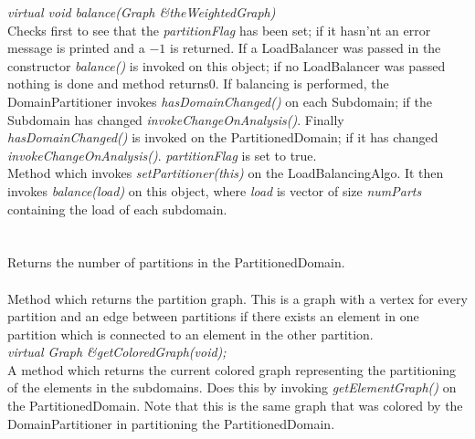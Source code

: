 {\em virtual void balance(Graph \&theWeightedGraph)} \\
Checks first to see that the {\em partitionFlag} has been set; if it
hasn'nt an error message is printed and a $-1$ is returned. If a
LoadBalancer was passed in the constructor {\em balance()} is invoked
on this object; if no LoadBalancer was passed nothing is done and
method returns$0$. If balancing is performed, the DomainPartitioner
invokes {\em hasDomainChanged()} on each Subdomain; if the Subdomain
has changed {\em invokeChangeOnAnalysis()}. Finally {\em
hasDomainChanged()} is invoked on the PartitionedDomain; if it has
changed {\em invokeChangeOnAnalysis()}. {\em partitionFlag} is set to
true. \\ 

Method which invokes {\em setPartitioner(this)} on the
LoadBalancingAlgo. It then invokes {\em balance(load)} on this
object, where {\em load} is vector of size {\em numParts}
containing the load of each subdomain. \\ 

  \\
 \\
Returns the number of partitions in the PartitionedDomain. \\

 \\
Method which returns the partition graph. This is a graph with a
vertex for every partition and an edge between partitions if there
exists an element in one partition which is connected to an element
in the other partition. \\

{\em virtual Graph \&getColoredGraph(void); } \\
A method which returns the current colored graph representing the
partitioning of the elements in the subdomains. Does this by invoking
{\em getElementGraph()} on the PartitionedDomain. Note that this is
the same graph that was colored by the DomainPartitioner in
partitioning the PartitionedDomain. \\ 

